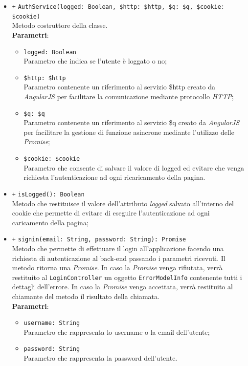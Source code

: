 \begin{itemize}
	\begin{itemize}
		\item \texttt{+} \texttt{AuthService(logged: Boolean, \$http: \$http, \$q: \$q, \$cookie: \$cookie)} \\ Metodo costruttore della classe. \\
		\textbf{Parametri}:
		\begin{itemize}
			\item \texttt{logged: Boolean} \\ Parametro che indica se l'utente è loggato o no;
			\item \texttt{\$http: \$http} \\ Parametro contenente un riferimento al servizio \$http creato da \textit{AngularJS} per facilitare la comunicazione mediante protocollo \textit{HTTP};
			\item \texttt{\$q: \$q} \\ Parametro contenente un riferimento al servizio \$q creato da \textit{AngularJS} per facilitare la gestione di funzione asincrone mediante l’utilizzo delle \textit{Promise};
			\item \texttt{\$cookie: \$cookie} \\ Parametro che consente di salvare il valore di logged ed evitare che venga richiesta l'autenticazione ad ogni ricaricamento della pagina.
		\end{itemize}
		\item \texttt{+} \texttt{isLogged(): Boolean} \\ Metodo che restituisce il valore dell'attributo \textit{logged} salvato all'interno del cookie che permette di evitare di eseguire l'autenticazione ad ogni caricamento della pagina;
		 
		\item \texttt{+} \texttt{signin(email: String, password: String): Promise}\\ Metodo che permette di effettuare il login all'applicazione facendo una richiesta di autenticazione al back-end passando i parametri ricevuti. Il metodo ritorna una \textit{Promise}. In caso la \textit{Promise} venga rifiutata, verrà restituito al \texttt{LoginController} un oggetto \texttt{ErrorModelInfo} contenente tutti i dettagli dell'errore. In caso la \textit{Promise} venga accettata, verrà restituito al chiamante del metodo il risultato della chiamata. \\
			\textbf{Parametri}: 
			\begin{itemize}
				\item \texttt{username: String} \\ Parametro che rappresenta lo username o la email dell'utente;
				\item \texttt{password: String} \\ Parametro che rappresenta la password dell'utente.
			\end{itemize}
			

\end{itemize}
\end{itemize}
